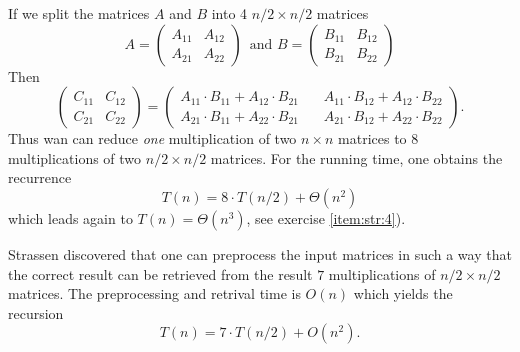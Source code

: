 If we split the matrices $A$ and $B$ into 4 $n/2 × n/2$ matrices 
\begin{equation}
  \label{eq:str:3}
  A =
  \begin{pmatrix}
    A_{11} & A_{12} \\ 
    A_{21} & A_{22} 
  \end{pmatrix} \, \text{ and }  B =
  \begin{pmatrix}
    B_{11} & B_{12} \\ 
    B_{21} & B_{22} 
  \end{pmatrix}
\end{equation}
Then 
\begin{displaymath}
  \begin{pmatrix}
    C_{11} & C_{12} \\
    C_{21} & C_{22}
  \end{pmatrix}
   =
  \begin{pmatrix}
    A_{11}\cdot B_{11} + A_{12}\cdot B_{21} & \, &  A_{11}\cdot B_{12} + A_{12}\cdot B_{22}  \\
        A_{21}\cdot B_{11} + A_{22}\cdot B_{21} &\, &     A_{21}\cdot B_{12} + A_{22}\cdot B_{22} 
  \end{pmatrix}.
\end{displaymath}
Thus wan can reduce \emph{one}   multiplication of two $n ×n$ matrices to $8$ multiplications of two $n/2 × n/2$ matrices. For the running time, one obtains the recurrence 
\begin{equation}
  \label{eq:stra:4}
  T(n ) = 8 \cdot T(n/2) + Θ(n^2) 
\end{equation}
which leads again to $T(n) = Θ(n^3)$, see exercise \ref{item:str:4}). 

Strassen discovered that one can preprocess the input matrices in such a way that the correct result can be retrieved from the result  $7$ multiplications of $n/2 × n/2$ matrices. The preprocessing and retrival time is $O(n)$ which yields the recursion 
\begin{equation}
  \label{eq:str:5}
  T(n) = 7 \cdot T(n/2) + O(n^2). 
\end{equation}

